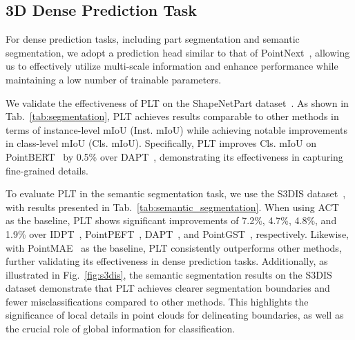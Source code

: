 









\subsection{3D Dense Prediction Task}
For dense prediction tasks, including part segmentation and semantic segmentation, we adopt a prediction head similar to that of PointNext~\cite{qian2022pointnext}, allowing us to effectively utilize multi-scale information and enhance performance while maintaining a low number of trainable parameters.

We validate the effectiveness of PLT on the ShapeNetPart dataset~\cite{yi2016scalable}. As shown in Tab.~\ref{tab:segmentation}, PLT achieves results comparable to other methods in terms of instance-level mIoU (Inst. mIoU) while achieving notable improvements in class-level mIoU (Cls. mIoU). Specifically, PLT improves Cls. mIoU on PointBERT~\cite{yu2022point} by 0.5\% over DAPT~\cite{zhou2024dynamic}, demonstrating its effectiveness in capturing fine-grained details.

To evaluate PLT in the semantic segmentation task, we use the S3DIS dataset~\cite{armeni20163d}, with results presented in Tab.~\ref{tab:semantic_segmentation}. When using ACT~\cite{dong2022autoencoders} as the baseline, PLT shows significant improvements of 7.2\%, 4.7\%, 4.8\%, and 1.9\% over IDPT~\cite{zha2023instance}, PointPEFT~\cite{tang2024point}, DAPT~\cite{zhou2024dynamic}, and PointGST~\cite{liang2024parameter}, respectively. Likewise, with PointMAE~\cite{pang2022masked} as the baseline, PLT consistently outperforms other methods, further validating its effectiveness in dense prediction tasks. Additionally, as illustrated in Fig.~\ref{fig:s3dis}, the semantic segmentation results on the S3DIS dataset demonstrate that PLT achieves clearer segmentation boundaries and fewer misclassifications compared to other methods. This highlights the significance of local details in point clouds for delineating boundaries, as well as the crucial role of global information for classification.








